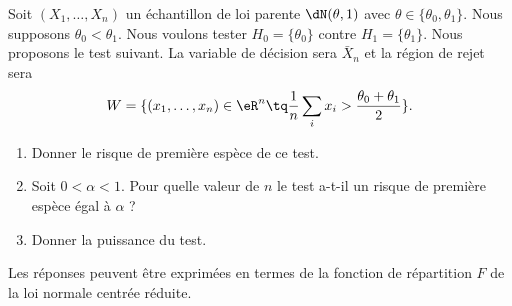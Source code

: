 \begin{example}

	Soit \( (X_1,\ldots,X_n)\) un échantillon de loi parente \( \dN(\theta,1)\) avec \( \theta\in\{ \theta_0,\theta_1 \}\). Nous supposons \( \theta_0<\theta_1\). Nous voulons tester \( H_0=\{ \theta_0 \}\) contre \( H_1=\{ \theta_1 \}\). Nous proposons le test suivant. La variable de décision sera \( \bar X_n\) et la région de rejet sera
	\begin{equation}
		W=\{ (x_1,\ldots,x_n)\in\eR^n\tq\frac{1}{ n }\sum_ix_i>\frac{ \theta_0+\theta_1 }{ 2 } \}.
	\end{equation}

	\begin{enumerate}
		\item
		      Donner le risque de première espèce de ce test.
		\item
		      Soit \( 0<\alpha<1\). Pour quelle valeur de \( n\) le test a-t-il un risque de première espèce égal à \( \alpha\) ?
		\item
		      Donner la puissance du test.
	\end{enumerate}
	Les réponses peuvent être exprimées en termes de la fonction de répartition \( F\) de la loi normale centrée réduite.


\end{example}
